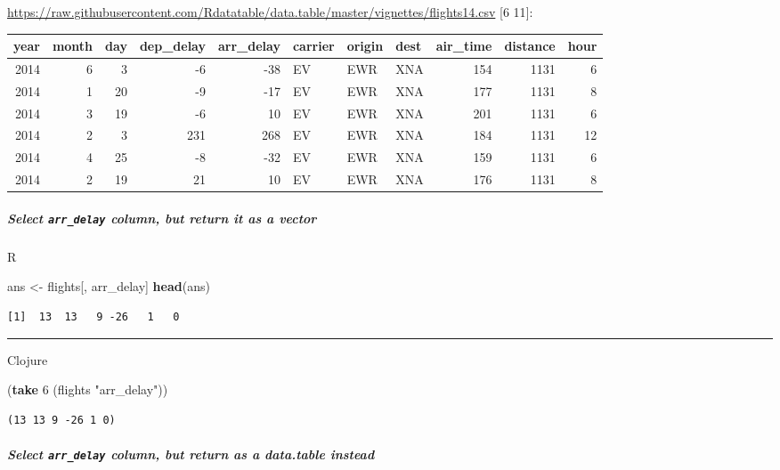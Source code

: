 \documentclass[]{article}
\newenvironment{Shaded}{\begin{snugshade}}{\end{snugshade}}
\newcommand{\KeywordTok}[1]{\textcolor[rgb]{0.13,0.29,0.53}{\textbf{#1}}}
\newcommand{\DecValTok}[1]{\textcolor[rgb]{0.00,0.00,0.81}{#1}}
\newcommand{\StringTok}[1]{\textcolor[rgb]{0.31,0.60,0.02}{#1}}
\newcommand{\NormalTok}[1]{#1}
\let\oldsubparagraph\subparagraph
\renewcommand{\subparagraph}[1]{\oldsubparagraph{#1}\mbox{}}
\begin{document}
\url{https://raw.githubusercontent.com/Rdatatable/data.table/master/vignettes/flights14.csv}
{[}6 11{]}:

\begin{longtable}[]{@{}rrrrrlllrrr@{}}
\toprule
year & month & day & dep\_delay & arr\_delay & carrier & origin & dest &
air\_time & distance & hour\tabularnewline
\midrule
\endhead
2014 & 6 & 3 & -6 & -38 & EV & EWR & XNA & 154 & 1131 & 6\tabularnewline
2014 & 1 & 20 & -9 & -17 & EV & EWR & XNA & 177 & 1131 &
8\tabularnewline
2014 & 3 & 19 & -6 & 10 & EV & EWR & XNA & 201 & 1131 & 6\tabularnewline
2014 & 2 & 3 & 231 & 268 & EV & EWR & XNA & 184 & 1131 &
12\tabularnewline
2014 & 4 & 25 & -8 & -32 & EV & EWR & XNA & 159 & 1131 &
6\tabularnewline
2014 & 2 & 19 & 21 & 10 & EV & EWR & XNA & 176 & 1131 & 8\tabularnewline
\bottomrule
\end{longtable}

\subparagraph{\texorpdfstring{Select \texttt{arr\_delay} column, but
return it as a
vector}{Select arr\_delay column, but return it as a vector}}\label{select-arr_delay-column-but-return-it-as-a-vector}

R

\begin{Shaded}
\begin{Highlighting}[]
\NormalTok{ans <-}\StringTok{ }\NormalTok{flights[, arr_delay]}
\KeywordTok{head}\NormalTok{(ans)}
\end{Highlighting}
\end{Shaded}

\begin{verbatim}
[1]  13  13   9 -26   1   0
\end{verbatim}

\begin{center}\rule{0.5\linewidth}{0.5pt}\end{center}

Clojure

\begin{Shaded}
\begin{Highlighting}[]
\NormalTok{(}\KeywordTok{take} \DecValTok{6}\NormalTok{ (flights }\StringTok{"arr_delay"}\NormalTok{))}
\end{Highlighting}
\end{Shaded}

\begin{verbatim}
(13 13 9 -26 1 0)
\end{verbatim}

\subparagraph{\texorpdfstring{Select \texttt{arr\_delay} column, but
return as a data.table
instead}{Select arr\_delay column, but return as a data.table instead}}\label{select-arr_delay-column-but-return-as-a-data.table-instead}
\end{document}

